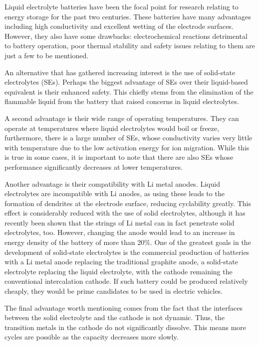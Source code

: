 \documentclass[10pt,a4paper, titlepage]{article}
\begin{document}
Liquid electrolyte batteries have been the focal point for research relating to energy storage for the past two centuries. 
These batteries have many advantages including high conductivity and excellent wetting of the electrode surfaces. 
However, they also have some drawbacks: electrochemical reactions detrimental to battery operation, poor thermal stability and  safety issues relating to them are just a few to be mentioned. \cite{RN10} 

An alternative that has gathered increasing interest is the use of solid-state electrolytes (SEs).
Perhaps the biggest advantage of SEs over their liquid-based equivalent is their enhanced safety. 
This chiefly stems from the elimination of the flammable liquid from the battery that raised concerns in liquid electrolytes.

A second advantage is their wide range of operating temperatures. 
They can operate at temperatures where liquid electrolytes would boil or freeze, furthermore, there is a large number of SEs, whose conductivity varies very little with temperature due to the low activation energy for ion migration. 
While this is true in some cases, it is important to note that there are also SEs whose performance significantly decreases at lower temperatures. \cite{RN41}

Another advantage is their compatibility with Li metal anodes. 
Liquid electrolytes are incompatible with Li anodes, as using these leads to the formation of dendrites at the electrode surface, reducing cyclability greatly.
This effect is considerably reduced with the use of solid electrolytes, although it has recently been shown that the strings of Li metal can in fact penetrate solid electrolytes, too. \cite{RN42}
However, changing the anode would lead to an increase in energy density of the battery of more than 20\%. \cite{RN43}
One of the greatest goals in the development of solid-state electrolytes is the commercial production of batteries with a Li metal anode replacing the traditional graphite anode, a solid-state electrolyte replacing the liquid electrolyte, with the cathode remaining the conventional intercalation cathode. 
If such battery could be produced relatively cheaply, they would be prime candidates to be used in electric vehicles. \cite{RN41}

The final advantage worth mentioning comes from the fact that the interfaces between the solid electrolyte and the cathode is not dynamic. 
Thus, the transition metals in the cathode do not significantly dissolve. 
This means more cycles are possible as the capacity decreases more slowly. 
\end{document}
